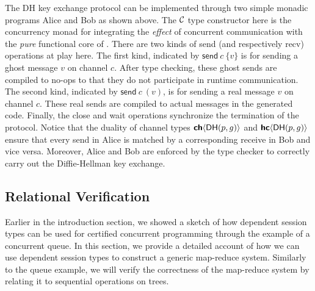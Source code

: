 The \textsf{DH} key exchange protocol can be implemented through two simple monadic
programs \textsf{Alice} and \textsf{Bob} as shown above. The $\mathcal{C}$ type constructor
here is the concurrency monad for integrating the \emph{effect} of concurrent
communication with the \emph{pure} functional core of \TLLC{}. There are two kinds of
\textsf{send} (and respectively \textsf{recv}) operations at play here.
The first kind, indicated by $\textsf{send}\ c\ \{v\}$ is for sending a ghost message
$v$ on channel $c$. After type checking, these ghost sends are compiled to no-ops
to that they do not participate in runtime communication. The second kind, indicated by
$\textsf{send}\ c\ (v)$, is for sending a real message $v$ on channel $c$. These
real sends are compiled to actual messages in the generated code. Finally, the
\textsf{close} and \textsf{wait} operations synchronize the termination of the protocol.
Notice that the duality of channel types ${\textbf{\textsf{ch}}\langle{\textsf{DH}(p,g)}\rangle}$ and ${\textbf{\textsf{hc}}\langle{\textsf{DH}(p,g)}\rangle}$
ensure that every send in \textsf{Alice} is matched by a corresponding receive in
\textsf{Bob} and vice versa. Moreover, \textsf{Alice} and \textsf{Bob} are enforced by the
type checker to correctly carry out the Diffie-Hellman key exchange.

\subsection{Relational Verification}
Earlier in the introduction section, we showed a sketch of how dependent session types
can be used for certified concurrent programming through the example of a concurrent queue.
In this section, we provide a detailed account of how we can use dependent session types
to construct a generic map-reduce system. Similarly to the queue example, we will verify
the correctness of the map-reduce system by relating it to sequential operations on trees.







